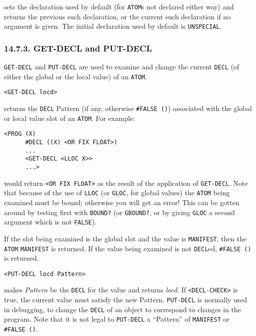 \documentclass[a4paper,]{article}
\begin{document}
 sets the declaration used by default (for \texttt{ATOM}s not declared either way) and
returns the previous such declaration, or the current such declaration if no argument is given. The initial declaration
used by default is \texttt{UNSPECIAL}.

\subsubsection{14.7.3. GET-DECL and PUT-DECL}\label{get-decl-and-put-decl}

\texttt{GET-DECL} and \texttt{PUT-DECL} are used to examine
and change the current \texttt{DECL} (of either the global or the local value) of an \texttt{ATOM}.

\begin{verbatim}
<GET-DECL locd>
\end{verbatim}

returns the \texttt{DECL} Pattern (if any, otherwise \texttt{\#FALSE\ ()}) associated with the global or local value slot
of an \texttt{ATOM}. For example:

\begin{verbatim}
<PROG (X)
      #DECL ((X) <OR FIX FLOAT>)
      ...
      <GET-DECL <LLOC X>>
      ...>
\end{verbatim}

would return \texttt{\textless{}OR\ FIX\ FLOAT\textgreater{}} as the result of the application of \texttt{GET-DECL}. Note
that because of the use of \texttt{LLOC} (or \texttt{GLOC}, for global values) the \texttt{ATOM} being examined must be
bound; otherwise you will get an error! This can be gotten around by testing first with \texttt{BOUND?} (or
\texttt{GBOUND?}, or by giving \texttt{GLOC} a second argument which is not \texttt{FALSE}).

If the slot being examined is the global slot and the value is \texttt{MANIFEST}, then the \texttt{ATOM} \texttt{MANIFEST}
is returned. If the value being examined is not \texttt{DECL}ed, \texttt{\#FALSE\ ()} is returned.

\begin{verbatim}
<PUT-DECL locd Pattern>
\end{verbatim}

makes \emph{Pattern} be the \texttt{DECL} for the value and returns \emph{locd}. If
\texttt{\textless{}DECL-CHECK\textgreater{}} is true, the current value must satisfy the new Pattern. \texttt{PUT-DECL} is
normally used in debugging, to change the \texttt{DECL} of an object to correspond to changes in the program. Note that it
is not legal to \texttt{PUT-DECL} a ``Pattern'' of \texttt{MANIFEST} or \texttt{\#FALSE\ ()}.
\end{document}
